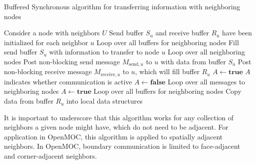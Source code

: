 \begin{algorithm*}[!h]
	\caption{Buffered Synchronous algorithm for transferring information with neighboring nodes}
	\label{alg:Buffered Synchronous}
	\begin{algorithmic}
		\State Consider a node with neighbors $U$ \hspace{\fill}
		\State Send buffer $S_u$ and receive buffer $R_u$ have been initialized for each neighbor $u$ \hspace{\fill}
		\vspace{0.1in}
		 \Comment Loop over all buffers for neighboring nodes
		\vspace{0.1in}
		\State Fill send buffer $S_u$ with information to transfer to node $u$
		\vspace{0.1in}
		\EndFor
		\vspace{0.1in}
		 \Comment Loop over all neighboring nodes
		\vspace{0.1in}
		\State Post non-blocking send message $M_{\text{send},u}$ to $u$ with data from buffer $S_u$
		\State Post non-blocking receive message $M_{\text{receive},u}$ to $u$, which will fill buffer $R_u$
		\vspace{0.1in}
		\EndFor
		\vspace{0.1in}
		\State $A \gets \textbf{true}$ \Comment $A$ indicates whether communication is active
		\vspace{0.1in}
		\State $A \gets \textbf{false}$
		 \Comment Loop over all messages to neighboring nodes
		\vspace{0.1in}
		\State $A \gets \textbf{true}$
		\EndIf
		\vspace{0.1in}
		\EndFor
		\EndWhile
		\vspace{0.1in}
		 \Comment Loop over all buffers for neighboring nodes
		\vspace{0.1in}
		\State Copy data from buffer $R_u$ into local data structures
		\vspace{0.1in}
		\EndFor
	\end{algorithmic}
\end{algorithm*}

It is important to underscore that this algorithm works for any collection of neighbors a given node might have, which do not need to be adjacent. For application in OpenMOC, this algorithm is applied to spatially adjacent neighbors. In OpenMOC, boundary communication is limited to face-adjacent and corner-adjacent neighbors.


